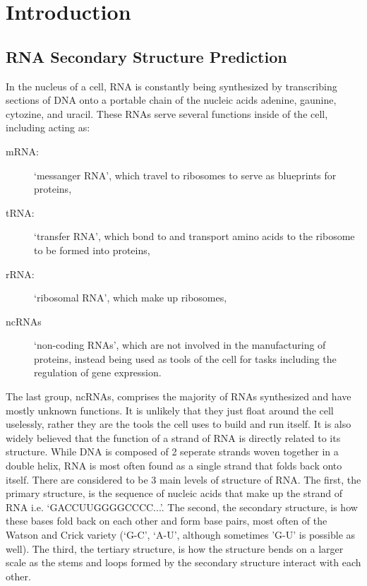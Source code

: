 \newcommand{\stack}[2]{\begin{array}{c}{ #1 \\ #2 }\end{array}}

\chapter{Introduction}

\section{RNA Secondary Structure Prediction}

In the nucleus of a cell, RNA is constantly being synthesized by
transcribing sections of DNA onto a portable chain of the nucleic
acids adenine, gaunine, cytozine, and uracil. These RNAs serve several
functions inside of the cell, including acting as:

\begin{description}
\item[mRNA:] `messanger RNA', which travel to ribosomes to serve as blueprints for
  proteins,
\item[tRNA:] `transfer RNA', which bond to and transport amino acids
  to the ribosome to be formed into proteins,
\item[rRNA:] `ribosomal RNA', which make up ribosomes,
\item[ncRNAs] `non-coding RNAs', which are not involved in the
  manufacturing of proteins, instead being used as tools of the cell
  for tasks including the regulation of gene expression.
\end{description} 

The last group, ncRNAs, comprises the majority of RNAs synthesized and
have mostly unknown functions. It is unlikely that they just float
around the cell uselessly, rather they are the tools the cell uses to
build and run itself. It is also widely believed that the function of
a strand of RNA is directly related to its structure. While DNA is
composed of 2 seperate strands woven together in a double helix, RNA
is most often found as a single strand that folds back onto
itself. There are considered to be 3 main levels of structure of
RNA. The first, the primary structure, is the sequence of nucleic
acids that make up the strand of RNA i.e. `GACCUUGGGGCCCC...'. The
second, the secondary structure, is how these bases fold back on each
other and form base pairs, most often of the Watson and Crick variety
(`G-C', `A-U', although sometimes 'G-U' is possible as well). The
third, the tertiary structure, is how the structure bends on a larger
scale as the stems and loops formed by the secondary structure
interact with each other.

